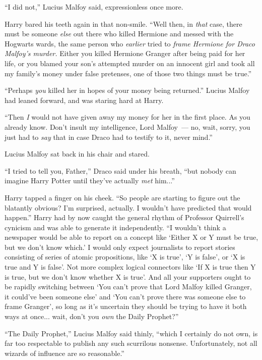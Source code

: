 ``I did not,'' Lucius Malfoy said, expressionless once more.

Harry bared his teeth again in that non-smile. ``Well then, in \emph{that} case, there must be someone \emph{else} out there who killed Hermione and messed with the Hogwarts wards, the same person who \emph{earlier} tried to \emph{frame Hermione for Draco Malfoy's murder.} Either you killed Hermione Granger after being paid for her life, or you blamed your son's attempted murder on an innocent girl and took all my family's money under false pretenses, one of those two things must be true.''

``Perhaps \emph{you} killed her in hopes of your money being returned.'' Lucius Malfoy had leaned forward, and was staring hard at Harry.

``Then \emph{I} would not have given away my money for her in the first place. As you already know. Don't insult my intelligence, Lord Malfoy~--- no, wait, sorry, you just had to \emph{say} that in case Draco had to testify to it, never mind.''

Lucius Malfoy sat back in his chair and stared.

``I tried to tell you, Father,'' Draco said under his breath, ``but nobody can imagine Harry Potter until they've actually \emph{met} him...''

Harry tapped a finger on his cheek. ``So people are starting to figure out the blatantly obvious? I'm surprised, actually. I wouldn't have predicted that would happen.'' Harry had by now caught the general rhythm of Professor Quirrell's cynicism and was able to generate it independently. ``I wouldn't think a newspaper would be able to report on a concept like `Either X or Y must be true, but we don't know which.' I would only expect journalists to report stories consisting of series of atomic propositions, like `X is true', `Y is false', or `X is true and Y is false'. Not more complex logical connectors like `If X is true then Y is true, but we don't know whether X is true'. And all your supporters ought to be rapidly switching between `You can't prove that Lord Malfoy killed Granger, it could've been someone else' and `You can't prove there was someone else to frame Granger', so long as it's uncertain they should be trying to have it both ways at once... wait, don't you \emph{own} the Daily Prophet?''

``The Daily Prophet,'' Lucius Malfoy said thinly, ``which I certainly do not own, is far too respectable to publish any such scurrilous nonsense. Unfortunately, not all wizards of influence are so reasonable.''

